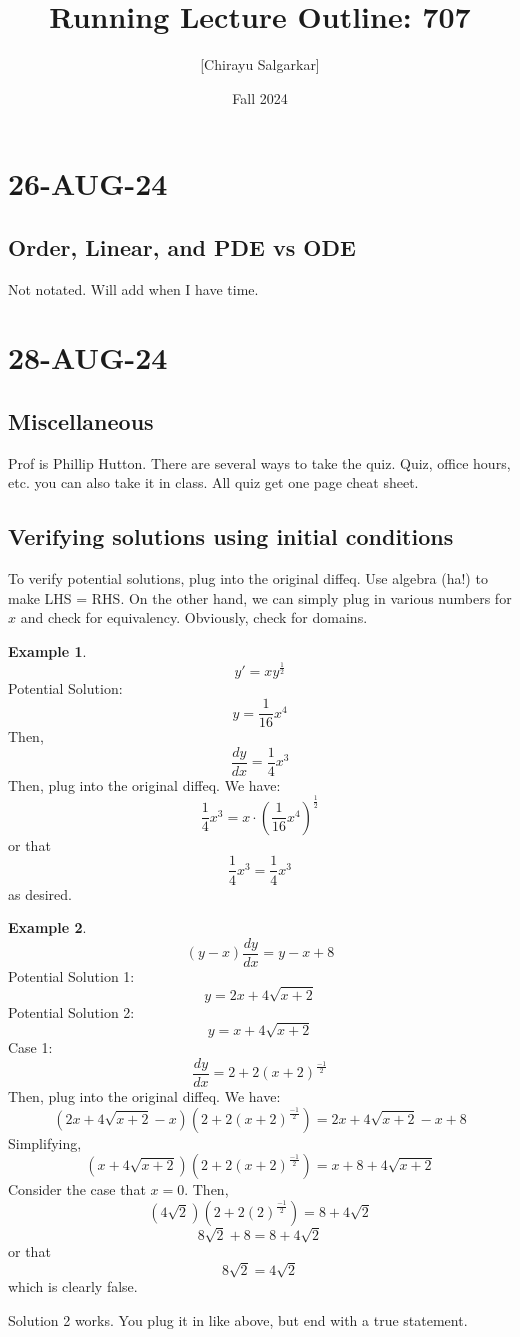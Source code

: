 \documentclass{article}
\title{Running Lecture Outline: 707}
\author{[Chirayu Salgarkar]}
\date{Fall 2024}
\theoremstyle{definition}
\newtheorem{example}{Example}[section]
\begin{document}
\maketitle
\tableofcontents

\vspace{.25in}
\section{26-AUG-24}
\subsection{Order, Linear, and PDE vs ODE}
Not notated. Will add when I have time. 
\section{28-AUG-24}

\subsection{Miscellaneous}
Prof is Phillip Hutton. There are several ways to take the quiz. Quiz, office hours, etc. you can also take it in class. All quiz get one page cheat sheet. 

\subsection{Verifying solutions using initial conditions}
To verify potential solutions, plug into the original diffeq. Use algebra (ha!) to make LHS = RHS. On the other hand, we can simply plug in various numbers for $x$ and check for equivalency. Obviously, check for domains. 
\begin{example}
   \[ y' = xy^{\frac{1}{2}}\]
Potential Solution: \[y = \frac{1}{16}x^4\]
Then, 
    \[\frac{dy}{dx} = \frac{1}{4}x^3 \]
Then, plug into the original diffeq. We have:
    \[ \frac{1}{4}x^3 = x \cdot (\frac{1}{16}x^4)^{\frac{1}{2}}\]
or that
    \[\frac{1}{4}x^3 = \frac{1}{4}x^3 \]
as desired. 
\end{example}

\begin{example}
    \[ (y-x)\frac{dy}{dx} = y-x+8\]
     Potential Solution 1: \[y = 2x + 4\sqrt{x+2}\]
    Potential Solution 2: \[y = x + 4\sqrt{x+2}\]
    Case 1:
     \[\frac{dy}{dx} = 2 + 2(x+2)^{\frac{-1}{2}} \]
     Then, plug into the original diffeq. We have:
     \[ (2x + 4\sqrt{x+2} - x)(2 + 2(x+2)^{\frac{-1}{2}}) = 2x + 4\sqrt{x+2} -x+8\]
     Simplifying,
    \[ (x + 4\sqrt{x+2})(2 + 2(x+2)^{\frac{-1}{2}}) = x+8 + 4\sqrt{x+2}\]
    Consider the case that $x=0$. Then,
    \[ (4\sqrt{2})(2 + 2(2)^{\frac{-1}{2}}) = 8 + 4\sqrt{2}\]
    \[8\sqrt{2} + 8 = 8 + 4\sqrt{2} \] 
    or that 
    \[8\sqrt{2} = 4\sqrt{2}\] 
 which is clearly false. 

 Solution 2 works. You plug it in like above, but end with a true statement. 
 \end{example}
\end{document}
